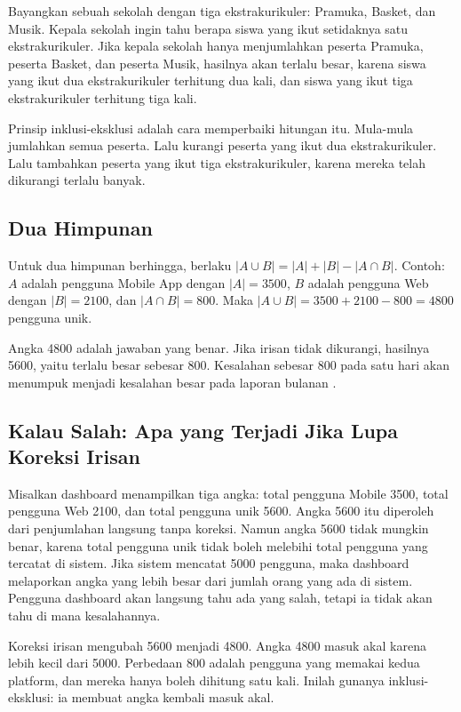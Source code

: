 \documentclass[11pt,a4paper]{article}
\begin{document}
Bayangkan sebuah sekolah dengan tiga ekstrakurikuler: Pramuka, Basket, dan Musik. Kepala sekolah ingin tahu berapa siswa yang ikut setidaknya satu ekstrakurikuler. Jika kepala sekolah hanya menjumlahkan peserta Pramuka, peserta Basket, dan peserta Musik, hasilnya akan terlalu besar, karena siswa yang ikut dua ekstrakurikuler terhitung dua kali, dan siswa yang ikut tiga ekstrakurikuler terhitung tiga kali.

Prinsip inklusi-eksklusi adalah cara memperbaiki hitungan itu. Mula-mula jumlahkan semua peserta. Lalu kurangi peserta yang ikut dua ekstrakurikuler. Lalu tambahkan peserta yang ikut tiga ekstrakurikuler, karena mereka telah dikurangi terlalu banyak.

\subsection{Dua Himpunan}

Untuk dua himpunan berhingga, berlaku $|A \cup B|=|A|+|B|-|A \cap B|$. Contoh: $A$ adalah pengguna Mobile App dengan $|A|=3500$, $B$ adalah pengguna Web dengan $|B|=2100$, dan $|A \cap B|=800$. Maka $|A \cup B|=3500+2100-800=4800$ pengguna unik.

Angka 4800 adalah jawaban yang benar. Jika irisan tidak dikurangi, hasilnya 5600, yaitu terlalu besar sebesar 800. Kesalahan sebesar 800 pada satu hari akan menumpuk menjadi kesalahan besar pada laporan bulanan \cite{rosen}.

\subsection{Kalau Salah: Apa yang Terjadi Jika Lupa Koreksi Irisan}

Misalkan dashboard menampilkan tiga angka: total pengguna Mobile 3500, total pengguna Web 2100, dan total pengguna unik 5600. Angka 5600 itu diperoleh dari penjumlahan langsung tanpa koreksi. Namun angka 5600 tidak mungkin benar, karena total pengguna unik tidak boleh melebihi total pengguna yang tercatat di sistem. Jika sistem mencatat 5000 pengguna, maka dashboard melaporkan angka yang lebih besar dari jumlah orang yang ada di sistem. Pengguna dashboard akan langsung tahu ada yang salah, tetapi ia tidak akan tahu di mana kesalahannya.

Koreksi irisan mengubah 5600 menjadi 4800. Angka 4800 masuk akal karena lebih kecil dari 5000. Perbedaan 800 adalah pengguna yang memakai kedua platform, dan mereka hanya boleh dihitung satu kali. Inilah gunanya inklusi-eksklusi: ia membuat angka kembali masuk akal.
\end{document}
